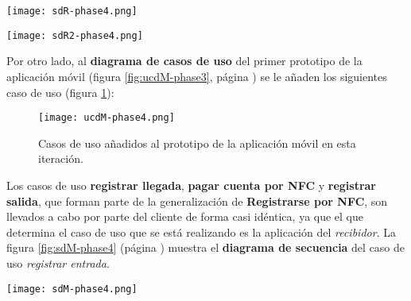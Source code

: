   \begin{sidewaysfigure}[h]
    \begin{center}
      \texttt{[image: sdR-phase4.png]}
      \caption{Diagrama de secuencia del caso de uso \emph{registrar salida
      por \acs{NFC}}.}
      \label{fig:sdR-phase4}
    \end{center}
  \end{sidewaysfigure}

  \begin{sidewaysfigure}[h]
    \begin{center}
      \texttt{[image: sdR2-phase4.png]}
      \caption{Diagrama de secuencia del caso de uso \emph{cobrar cliente
      por \acs{NFC}}.}
      \label{fig:sdR2-phase4}
    \end{center}
  \end{sidewaysfigure}

Por otro lado, al \textbf{diagrama de casos de uso} del primer prototipo
de la aplicación móvil (figura \ref{fig:ucdM-phase3}, página
\pageref{fig:ucdM-phase3}) se le añaden los siguientes caso de uso (figura
\ref{fig:ucdM-phase4}):

  \begin{figure}[H]
    \begin{center}
      \texttt{[image: ucdM-phase4.png]}
      \caption{Casos de uso añadidos al prototipo de la aplicación
      móvil en esta iteración.}
      \label{fig:ucdM-phase4}
    \end{center}
  \end{figure}

Los casos de uso \textbf{registrar llegada}, \textbf{pagar cuenta por
\acs{NFC}} y \textbf{registrar salida}, que forman parte de la generalización
de \textbf{Registrarse por \acs{NFC}}, son llevados a cabo por parte del
cliente de forma casi idéntica, ya que el que determina el caso de uso que
se está realizando es la aplicación del \emph{recibidor}. La figura
\ref{fig:sdM-phase4} (página \pageref{fig:sdM-phase4}) muestra el
\textbf{diagrama de secuencia} del caso de uso \emph{registrar entrada}.

  \begin{sidewaysfigure}[h]
    \begin{center}
      \texttt{[image: sdM-phase4.png]}
      \caption{Diagrama de secuencia del caso de uso \emph{registrar entrada},
      de la aplicación móvil.}
      \label{fig:sdM-phase4}
    \end{center}
  \end{sidewaysfigure}

